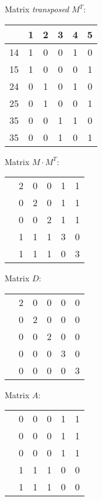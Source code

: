 \documentclass[12pt,letterpaper]{article}
\begin{document}
Matrix \emph{transposed} $M^T$:
\begin{flushright}
\begin{tabular}{|*{6}{c|}}
      \hline
       & 1 & 2 & 3 & 4 & 5\\
      \hline
    14 & 1 & 0 & 0 & 1 & 0\\
      \hline
    15 & 1 & 0 & 0 & 0 & 1\\
      \hline
    24 & 0 & 1 & 0 & 1 & 0\\
      \hline
    25 & 0 & 1 & 0 & 0 & 1\\
      \hline
    35 & 0 & 0 & 1 & 1 & 0\\
      \hline
    35 & 0 & 0 & 1 & 0 & 1\\
      \hline
\end{tabular}
\end{flushright}

\pagebreak
Matrix $M\cdot M^T$:
\begin{flushright}
\begin{tabular}{|*{6}{c|}}
      \hline
      &   &   &   &   &  \\
      \hline
      & 2 & 0 & 0 & 1 & 1\\
      \hline
      & 0 & 2 & 0 & 1 & 1\\
      \hline
      & 0 & 0 & 2 & 1 & 1\\
      \hline
      & 1 & 1 & 1 & 3 & 0\\
      \hline
      & 1 & 1 & 1 & 0 & 3\\
      \hline
\end{tabular}
\end{flushright}


Matrix $D$:
\begin{flushright}
\begin{tabular}{|*{6}{c|}}
      \hline
      &   &   &   &   &  \\
      \hline
      & 2 & 0 & 0 & 0 & 0\\
      \hline
      & 0 & 2 & 0 & 0 & 0\\
      \hline
      & 0 & 0 & 2 & 0 & 0\\
      \hline
      & 0 & 0 & 0 & 3 & 0\\
      \hline
      & 0 & 0 & 0 & 0 & 3\\
      \hline
\end{tabular}
\end{flushright}


Matrix $A$:
\begin{flushright}
\begin{tabular}{|*{6}{c|}}
      \hline
      &   &   &   &   &  \\
      \hline
      & 0 & 0 & 0 & 1 & 1\\
      \hline
      & 0 & 0 & 0 & 1 & 1\\
      \hline
      & 0 & 0 & 0 & 1 & 1\\
      \hline
      & 1 & 1 & 1 & 0 & 0\\
      \hline
      & 1 & 1 & 1 & 0 & 0\\
      \hline
\end{tabular}
\end{flushright}
\end{document}
